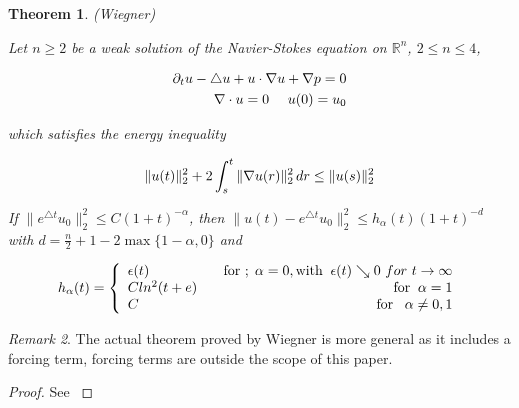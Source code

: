 \documentclass{amsart}
\newtheorem {Theorem}  {Theorem}
\numberwithin{Theorem}{section}
\numberwithin{equation}{section}
\theoremstyle{definition}
\theoremstyle{remark}
\newtheorem{Remark}[Theorem]{Remark}
\begin{document}
\begin{Theorem}(Wiegner)\label{theorem:wiegner}

Let $n\geq 2$ be a weak solution of the Navier-Stokes equation on $\mathbb{R}^n$, $2\leq n\leq 4$,

\begin{align}\label{PDE:NS}
\partial_t u-\triangle u+u\cdot\nabla u +\nabla p=0\\
\nabla\cdot u=0\ \ \ \ u(0)=u_0\notag
\end{align}

which satisfies the energy inequality

\begin{equation}
\|u(t)\|_2^2+2\int_s^t\|\nabla u(r)\|_2^2\,dr\leq \|u(s)\|^2_2\notag
\end{equation}

If $\|e^{\triangle t}u_0\|_2^2\leq C(1+t)^{-\alpha}$, then $\|u(t)-e^{\triangle t}u_0\|_2^2\leq h_{\alpha}(t)(1+t)^{-d}$ with $d=\frac{n}{2}+1-2\max\{1-\alpha,0\}$  and

\begin{equation}
 h_{\alpha}(t)=\left\{
 \begin{array}{lr}
 \epsilon(t) &\;\;\mbox{ for} \ ;\;\alpha=0,\mbox{with} \;\;\epsilon(t)\searrow 0\ for\ t\rightarrow \infty\notag\\
C ln^2(t+e)&\;\; \mbox{for} \;\; \alpha=1\notag\\
C&\;\;\mbox{ for} \;\;\; \alpha\neq 0,1
\end{array} \right.
\end{equation}

 

\end{Theorem}

\begin{Remark}
The actual theorem proved by Wiegner is more general as it includes a forcing term, forcing terms are outside the scope of this paper.
\end{Remark}

\begin{proof}

See \cite{W}

\end{proof}
\end{document}
